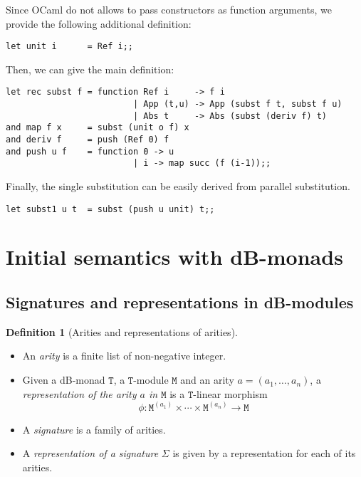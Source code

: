 \documentclass[a4paper,twoside,12pt]{article}
\theoremstyle{definition}
\newtheorem{definition}{Definition}
\theoremstyle{remark}
\theoremstyle{example}
\newcommand{\TT}{\mathtt{T}}
\newcommand{\MM}{\mathtt{M}}
\begin{document}
Since OCaml do not allows to pass constructors as function arguments,
we provide the following additional definition:
\begin{verbatim}
let unit i      = Ref i;;
\end{verbatim}

Then, we can give the main definition:
\begin{verbatim}
let rec subst f = function Ref i     -> f i
                         | App (t,u) -> App (subst f t, subst f u)
                         | Abs t     -> Abs (subst (deriv f) t)
and map f x     = subst (unit o f) x
and deriv f     = push (Ref 0) f
and push u f    = function 0 -> u
                         | i -> map succ (f (i-1));;
\end{verbatim}

Finally, the single substitution can be easily derived from parallel substitution.
\begin{verbatim}
let subst1 u t  = subst (push u unit) t;;
\end{verbatim}

\section{Initial semantics with dB-monads}
\label{sec:init-semantics}

\subsection{Signatures and representations in dB-modules}
\label{sec:signatures-representations}

\begin{definition}[Arities and representations of arities]
  \hfill
  \begin{itemize}
  \item An \emph{arity} is a finite list of non-negative integer.
  \item Given a dB-monad $\TT$, a $\TT$-module $\MM$ and an arity
    $a=(a_1,\dots,a_n)$, a \emph{representation of the arity $a$ in
      $\MM$} is a $\TT$-linear morphism
    \begin{equation*}
      \phi:\MM^{(a_1)}\times\cdots\times\MM^{(a_n)} \longrightarrow \MM
    \end{equation*}
  \item A \emph{signature} is a family of arities.
  \item A \emph{representation of a signature} $\Sigma$ is given by a
    representation for each of its arities.
  \end{itemize}
\end{definition}
\end{document}
